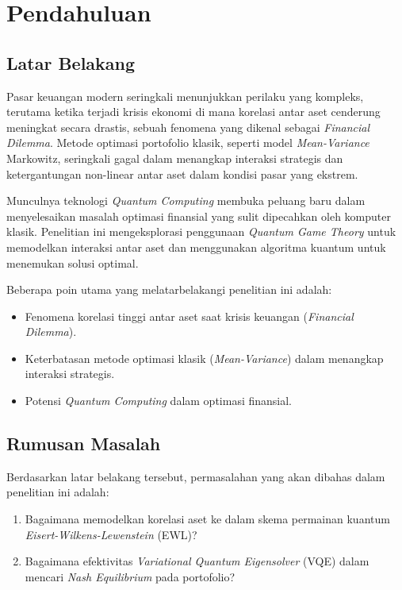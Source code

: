 \chapter{Pendahuluan}

\section{Latar Belakang}
Pasar keuangan modern seringkali menunjukkan perilaku yang kompleks, terutama ketika terjadi krisis ekonomi di mana korelasi antar aset cenderung meningkat secara drastis, sebuah fenomena yang dikenal sebagai \textit{Financial Dilemma}. Metode optimasi portofolio klasik, seperti model \textit{Mean-Variance} Markowitz, seringkali gagal dalam menangkap interaksi strategis dan ketergantungan non-linear antar aset dalam kondisi pasar yang ekstrem.

Munculnya teknologi \textit{Quantum Computing} membuka peluang baru dalam menyelesaikan masalah optimasi finansial yang sulit dipecahkan oleh komputer klasik. Penelitian ini mengeksplorasi penggunaan \textit{Quantum Game Theory} untuk memodelkan interaksi antar aset dan menggunakan algoritma kuantum untuk menemukan solusi optimal.

Beberapa poin utama yang melatarbelakangi penelitian ini adalah:
\begin{itemize}
    \item Fenomena korelasi tinggi antar aset saat krisis keuangan (\textit{Financial Dilemma}).
    \item Keterbatasan metode optimasi klasik (\textit{Mean-Variance}) dalam menangkap interaksi strategis.
    \item Potensi \textit{Quantum Computing} dalam optimasi finansial.
\end{itemize}

\section{Rumusan Masalah}
Berdasarkan latar belakang tersebut, permasalahan yang akan dibahas dalam penelitian ini adalah:
\begin{enumerate}
    \item Bagaimana memodelkan korelasi aset ke dalam skema permainan kuantum \textit{Eisert-Wilkens-Lewenstein} (EWL)?
    \item Bagaimana efektivitas \textit{Variational Quantum Eigensolver} (VQE) dalam mencari \textit{Nash Equilibrium} pada portofolio?
\end{enumerate}

